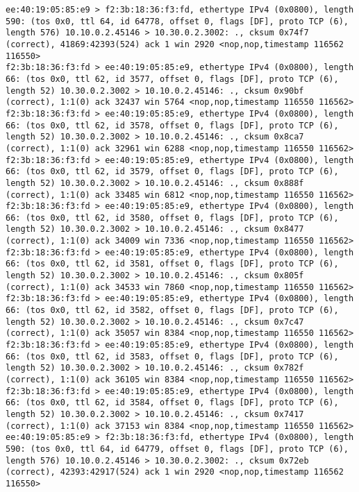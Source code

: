\documentclass[a4paper,12pt]{article}
\begin{document}
\begin{Verbatim}
ee:40:19:05:85:e9 > f2:3b:18:36:f3:fd, ethertype IPv4 (0x0800), length 590: (tos 0x0, ttl 64, id 64778, offset 0, flags [DF], proto TCP (6), length 576) 10.10.0.2.45146 > 10.30.0.2.3002: ., cksum 0x74f7 (correct), 41869:42393(524) ack 1 win 2920 <nop,nop,timestamp 116562 116550>
f2:3b:18:36:f3:fd > ee:40:19:05:85:e9, ethertype IPv4 (0x0800), length 66: (tos 0x0, ttl 62, id 3577, offset 0, flags [DF], proto TCP (6), length 52) 10.30.0.2.3002 > 10.10.0.2.45146: ., cksum 0x90bf (correct), 1:1(0) ack 32437 win 5764 <nop,nop,timestamp 116550 116562>
f2:3b:18:36:f3:fd > ee:40:19:05:85:e9, ethertype IPv4 (0x0800), length 66: (tos 0x0, ttl 62, id 3578, offset 0, flags [DF], proto TCP (6), length 52) 10.30.0.2.3002 > 10.10.0.2.45146: ., cksum 0x8ca7 (correct), 1:1(0) ack 32961 win 6288 <nop,nop,timestamp 116550 116562>
f2:3b:18:36:f3:fd > ee:40:19:05:85:e9, ethertype IPv4 (0x0800), length 66: (tos 0x0, ttl 62, id 3579, offset 0, flags [DF], proto TCP (6), length 52) 10.30.0.2.3002 > 10.10.0.2.45146: ., cksum 0x888f (correct), 1:1(0) ack 33485 win 6812 <nop,nop,timestamp 116550 116562>
f2:3b:18:36:f3:fd > ee:40:19:05:85:e9, ethertype IPv4 (0x0800), length 66: (tos 0x0, ttl 62, id 3580, offset 0, flags [DF], proto TCP (6), length 52) 10.30.0.2.3002 > 10.10.0.2.45146: ., cksum 0x8477 (correct), 1:1(0) ack 34009 win 7336 <nop,nop,timestamp 116550 116562>
f2:3b:18:36:f3:fd > ee:40:19:05:85:e9, ethertype IPv4 (0x0800), length 66: (tos 0x0, ttl 62, id 3581, offset 0, flags [DF], proto TCP (6), length 52) 10.30.0.2.3002 > 10.10.0.2.45146: ., cksum 0x805f (correct), 1:1(0) ack 34533 win 7860 <nop,nop,timestamp 116550 116562>
f2:3b:18:36:f3:fd > ee:40:19:05:85:e9, ethertype IPv4 (0x0800), length 66: (tos 0x0, ttl 62, id 3582, offset 0, flags [DF], proto TCP (6), length 52) 10.30.0.2.3002 > 10.10.0.2.45146: ., cksum 0x7c47 (correct), 1:1(0) ack 35057 win 8384 <nop,nop,timestamp 116550 116562>
f2:3b:18:36:f3:fd > ee:40:19:05:85:e9, ethertype IPv4 (0x0800), length 66: (tos 0x0, ttl 62, id 3583, offset 0, flags [DF], proto TCP (6), length 52) 10.30.0.2.3002 > 10.10.0.2.45146: ., cksum 0x782f (correct), 1:1(0) ack 36105 win 8384 <nop,nop,timestamp 116550 116562>
f2:3b:18:36:f3:fd > ee:40:19:05:85:e9, ethertype IPv4 (0x0800), length 66: (tos 0x0, ttl 62, id 3584, offset 0, flags [DF], proto TCP (6), length 52) 10.30.0.2.3002 > 10.10.0.2.45146: ., cksum 0x7417 (correct), 1:1(0) ack 37153 win 8384 <nop,nop,timestamp 116550 116562>
ee:40:19:05:85:e9 > f2:3b:18:36:f3:fd, ethertype IPv4 (0x0800), length 590: (tos 0x0, ttl 64, id 64779, offset 0, flags [DF], proto TCP (6), length 576) 10.10.0.2.45146 > 10.30.0.2.3002: ., cksum 0x72eb (correct), 42393:42917(524) ack 1 win 2920 <nop,nop,timestamp 116562 116550>

\end{Verbatim}
\end{document}

